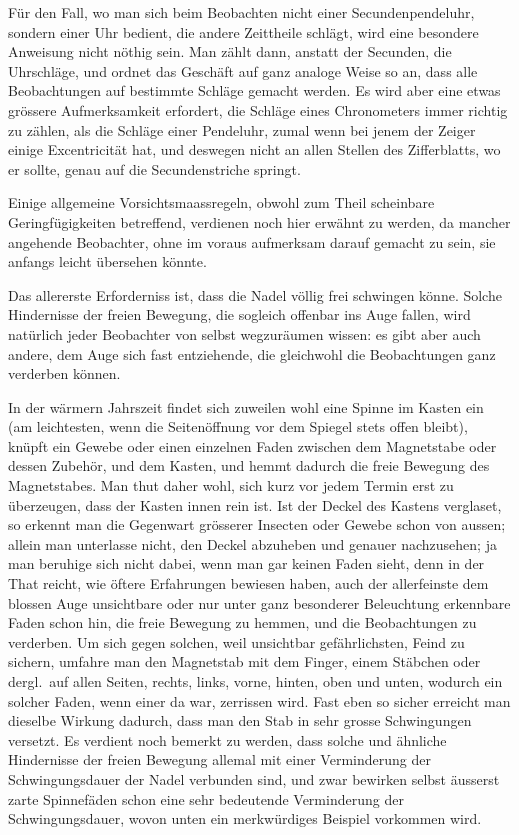 Für den Fall, wo man sich beim Beobachten nicht einer Secundenpendeluhr, sondern einer Uhr bedient, die andere Zeittheile schlägt, wird eine besondere Anweisung nicht nöthig sein. Man zählt dann, anstatt der Secunden, die Uhrschläge, und ordnet das Geschäft auf ganz analoge Weise so an, dass alle Beobachtungen auf bestimmte Schläge gemacht werden. Es wird aber eine etwas grössere Aufmerksamkeit erfordert, die Schläge eines Chronometers immer richtig zu zählen, als die Schläge einer Pendeluhr, zumal wenn bei jenem der Zeiger einige Excentricität hat, und deswegen nicht an allen Stellen des Zifferblatts, wo er sollte, genau auf die Secundenstriche springt.

Einige allgemeine Vorsichtsmaassregeln, obwohl zum Theil scheinbare Geringfügigkeiten betreffend, verdienen noch hier erwähnt zu werden, da mancher angehende Beobachter, ohne im voraus aufmerksam darauf gemacht zu sein, sie anfangs leicht übersehen könnte.

Das allererste Erforderniss ist, dass die Nadel völlig frei schwingen könne. Solche Hindernisse der freien Bewegung, die sogleich offenbar ins Auge fallen, wird natürlich jeder Beobachter von selbst wegzuräumen wissen: es gibt aber auch andere, dem Auge sich fast entziehende, die gleichwohl die Beobachtungen ganz verderben können.

In der wärmern Jahrszeit findet sich zuweilen wohl eine Spinne im Kasten ein (am leichtesten, wenn die Seitenöffnung vor dem Spiegel stets offen bleibt), knüpft ein Gewebe oder einen einzelnen Faden zwischen dem Magnetstabe oder dessen Zubehör, und dem Kasten, und hemmt dadurch die freie Bewegung des
Magnetstabes. Man thut daher wohl, sich kurz vor jedem Termin erst zu überzeugen, dass der Kasten innen rein ist. Ist der Deckel des Kastens verglaset, so erkennt man die Gegenwart grösserer Insecten oder Gewebe schon von aussen; allein man unterlasse nicht, den Deckel abzuheben und genauer nachzusehen; ja man beruhige sich nicht dabei, wenn man gar keinen Faden sieht, denn in der That reicht, wie öftere Erfahrungen bewiesen haben, auch der allerfeinste dem blossen Auge unsichtbare oder nur unter ganz besonderer Beleuchtung erkennbare Faden schon hin, die freie Bewegung zu hemmen, und die Beobachtungen zu verderben. Um sich gegen solchen, weil unsichtbar gefährlichsten, Feind zu sichern, umfahre man den Magnetstab mit dem Finger, einem Stäbchen oder dergl.\ auf allen Seiten, rechts, links, vorne, hinten, oben und unten, wodurch ein solcher Faden, wenn einer da war, zerrissen wird. Fast eben so sicher erreicht man dieselbe Wirkung dadurch, dass man den Stab in sehr grosse Schwingungen versetzt. Es verdient noch bemerkt zu werden, dass solche und ähnliche Hindernisse der freien Bewegung allemal mit einer Verminderung der Schwingungsdauer der Nadel verbunden sind, und zwar bewirken selbst äusserst zarte Spinnefäden schon eine sehr bedeutende Verminderung der Schwingungsdauer, wovon unten ein merkwürdiges Beispiel vorkommen wird.

